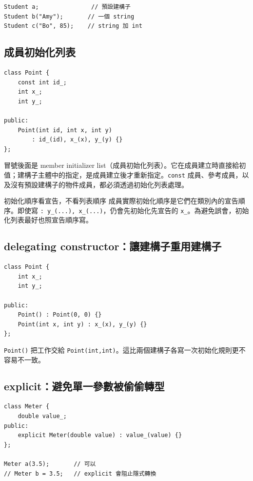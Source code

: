 \documentclass[11pt,a4paper]{article}
\newcommand{\code}[1]{\texttt{#1}}
\begin{document}
\begin{lstlisting}
Student a;               // 預設建構子
Student b("Amy");       // 一個 string
Student c("Bo", 85);    // string 加 int
\end{lstlisting}

\subsection{成員初始化列表}

\begin{lstlisting}
class Point {
    const int id_;
    int x_;
    int y_;

public:
    Point(int id, int x, int y)
        : id_(id), x_(x), y_(y) {}
};
\end{lstlisting}

冒號後面是 member initializer list（成員初始化列表）。它在成員建立時直接給初值；建構子主體中的指定，是成員建立後才重新指定。\code{const} 成員、參考成員，以及沒有預設建構子的物件成員，都必須透過初始化列表處理。

\begin{warnbox}{初始化順序看宣告，不看列表順序}
成員實際初始化順序是它們在類別內的宣告順序。即使寫 \code{: y\_(...), x\_(...)}，仍會先初始化先宣告的 \code{x\_}。為避免誤會，初始化列表最好也照宣告順序寫。
\end{warnbox}

\subsection{delegating constructor：讓建構子重用建構子}

\begin{lstlisting}
class Point {
    int x_;
    int y_;

public:
    Point() : Point(0, 0) {}
    Point(int x, int y) : x_(x), y_(y) {}
};
\end{lstlisting}

\code{Point()} 把工作交給 \code{Point(int,int)}。這比兩個建構子各寫一次初始化規則更不容易不一致。

\subsection{explicit：避免單一參數被偷偷轉型}

\begin{lstlisting}
class Meter {
    double value_;
public:
    explicit Meter(double value) : value_(value) {}
};

Meter a(3.5);       // 可以
// Meter b = 3.5;   // explicit 會阻止隱式轉換
\end{lstlisting}
\end{document}

